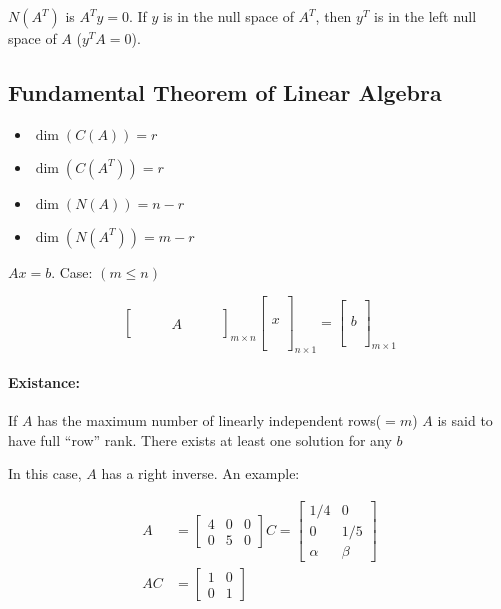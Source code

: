 $N(A^T)$ is $A^T y = 0$. If $y$ is in the null space of $A^T$, then $y^T$ is in the left null space of $A$ ($y^TA = 0$).

\subsection{Fundamental Theorem of Linear Algebra}

\begin{itemize}
  \item $\dim(C(A)) = r$
  \item $\dim(C(A^T)) = r$
  \item $\dim(N(A)) = n-r$
  \item $\dim(N(A^T)) = m-r$
\end{itemize}

$Ax=b$. Case: $(m \le n)$

\[
  \begin{bmatrix}
    & & & & & & \\
    & & & A & & & \\
    & & & & & & 
  \end{bmatrix}_{m \times n}
  \begin{bmatrix}
    \\ \\ \\ x \\ \\ \\ \\
  \end{bmatrix}_{n \times 1} = 
  \begin{bmatrix}
    \\ \\ b \\ \\ \\
  \end{bmatrix}_{m \times 1}
\]

\paragraph{Existance:} If $A$ has the maximum number of linearly independent rows($=m$) $A$ is said to have full ``row'' rank. There exists at least one solution for any $b$

In this case, $A$ has a right inverse. An example:

\begin{align*}
  A &= 
  \begin{bmatrix}
    4 & 0 & 0 \\ 0 & 5 & 0
  \end{bmatrix}
  C =
  \begin{bmatrix}
    1/4 & 0 \\ 0 & 1/5 \\ \alpha & \beta
  \end{bmatrix} \\
  AC &= \begin{bmatrix}
    1 & 0 \\ 0 & 1
  \end{bmatrix}
\end{align*}

